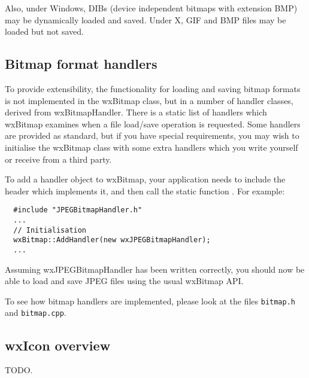 Also, under Windows, DIBs (device independent bitmaps with extension BMP)
may be dynamically loaded and saved. Under X, GIF and BMP files may be
loaded but not saved.

\subsection{Bitmap format handlers}

To provide extensibility, the functionality for loading and saving bitmap formats
is not implemented in the wxBitmap class, but in a number of handler classes,
derived from wxBitmapHandler. There is a static list of handlers which wxBitmap
examines when a file load/save operation is requested. Some handlers are provided as standard, but if you
have special requirements, you may wish to initialise the wxBitmap class with
some extra handlers which you write yourself or receive from a third party.

To add a handler object to wxBitmap, your application needs to include the header which implements it, and
then call the static function . For example:

{\small
\begin{verbatim}
  #include "JPEGBitmapHandler.h"
  ...
  // Initialisation
  wxBitmap::AddHandler(new wxJPEGBitmapHandler);
  ...
\end{verbatim}
}

Assuming wxJPEGBitmapHandler has been written correctly, you should now be able to load and save JPEG files
using the usual wxBitmap API.

To see how bitmap handlers are implemented, please look at the files {\tt bitmap.h} and {\tt bitmap.cpp}.

\subsection{wxIcon overview}\label{wxiconoverview}

TODO.

